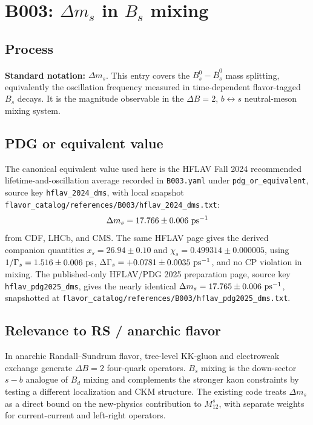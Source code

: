 
\section{B003: \(\Delta m_s\) in \(B_s\) mixing}

\subsection*{Process}
\textbf{Standard notation:} \(\Delta m_s\).  This entry covers the
\(B_s^0-\bar B_s^0\) mass splitting, equivalently the oscillation frequency
measured in time-dependent flavor-tagged \(B_s\) decays.  It is the magnitude
observable in the \(\Delta B=2\), \(b\leftrightarrow s\) neutral-meson mixing
system.

\subsection*{PDG or equivalent value}
The canonical equivalent value used here is the HFLAV Fall 2024 recommended
lifetime-and-oscillation average recorded in \texttt{B003.yaml} under
\texttt{pdg\_or\_equivalent}, source key \texttt{hflav\_2024\_dms}, with local
snapshot \texttt{flavor\_catalog/references/B003/hflav\_2024\_dms.txt}:
\[
  \Delta m_s = 17.766\pm0.006~{\rm ps}^{-1}
\]
from CDF, LHCb, and CMS.  The same HFLAV page gives the derived companion
quantities \(x_s=26.94\pm0.10\) and
\(\chi_s=0.499314\pm0.000005\), using
\(1/\Gamma_s=1.516\pm0.006~{\rm ps}\),
\(\Delta\Gamma_s=+0.0781\pm0.0035~{\rm ps}^{-1}\), and no CP violation in
mixing.  The published-only HFLAV/PDG 2025 preparation page, source key
\texttt{hflav\_pdg2025\_dms}, gives the nearly identical
\(\Delta m_s=17.765\pm0.006~{\rm ps}^{-1}\), snapshotted at
\texttt{flavor\_catalog/references/B003/hflav\_pdg2025\_dms.txt}.

\subsection*{Relevance to RS / anarchic flavor}
In anarchic Randall--Sundrum flavor, tree-level KK-gluon and electroweak
exchange generate \(\Delta B=2\) four-quark operators.  \(B_s\) mixing is the
down-sector \(s-b\) analogue of \(B_d\) mixing and complements the stronger
kaon constraints by testing a different localization and CKM structure.  The
existing code treats \(\Delta m_s\) as a direct bound on the new-physics
contribution to \(M_{12}^s\), with separate weights for current-current and
left-right operators.

